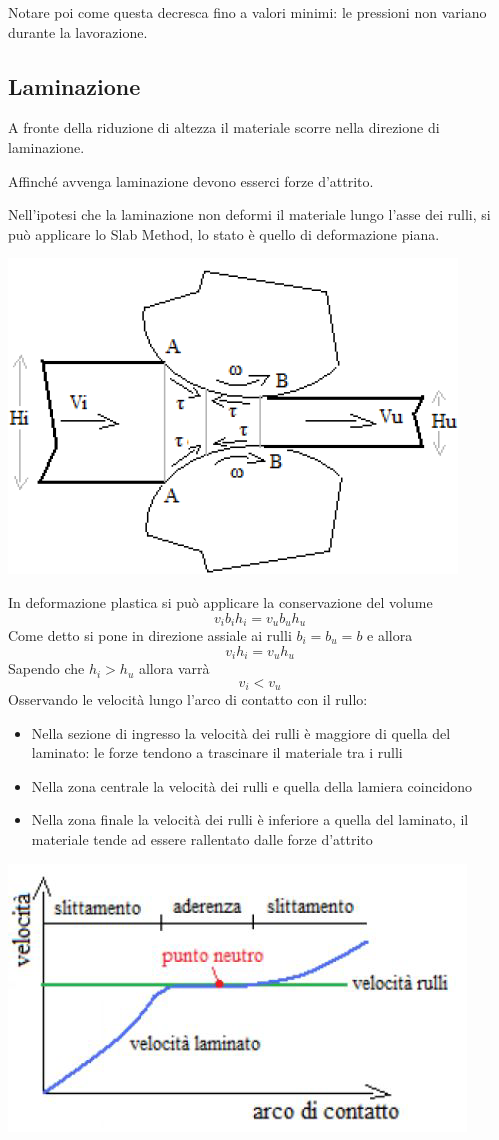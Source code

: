\documentclass[a4paper, 15pt]{article}
\newcommand{\compresslist}{ %
			\setlength{\itemsep}{1pt}
			\setlength{\parskip}{0pt}
			\setlength{\parsep}{0pt}
		}
\begin{document}
	Notare poi come questa decresca fino a valori minimi: le pressioni non variano durante la lavorazione. 
\newpage	
	\subsection{Laminazione}
	A fronte della riduzione di altezza il materiale scorre nella direzione di laminazione. 
	
	Affinché avvenga laminazione devono esserci forze d'attrito. 
	
	Nell'ipotesi che la laminazione non deformi il materiale lungo l'asse dei rulli, si può applicare lo Slab Method, lo stato è quello di deformazione piana. 
\begin{center}
	\includegraphics[width=0.5\linewidth]{figures/def6}
\end{center}
	In deformazione plastica si può applicare la conservazione del volume
	\[v_ib_ih_i = v_ub_uh_u\]
	Come detto si pone in direzione assiale ai rulli $b_i=b_u = b$ e allora 
	\[v_ih_i = v_uh_u\]
	Sapendo che $h_i>h_u$ allora varrà 
	\[v_i<v_u\]
	Osservando le velocità lungo l'arco di contatto con il rullo:
	\begin{itemize}\compresslist
		\item Nella sezione di ingresso la velocità dei rulli è maggiore di quella del laminato: le forze tendono a trascinare il materiale tra i rulli
		\item Nella zona centrale la velocità dei rulli e quella della lamiera coincidono
		\item Nella zona finale la velocità dei rulli è inferiore a quella del laminato, il materiale
		tende ad essere rallentato dalle forze d'attrito
	\end{itemize}
\begin{center}
	\includegraphics[width=0.5\linewidth]{figures/def7}
\end{center}
\end{document}
